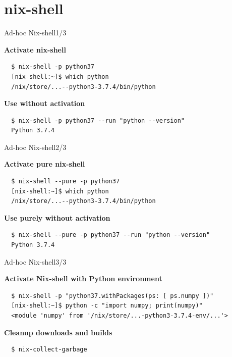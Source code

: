 \documentclass[10pt,aspectratio=169]{beamer}
\begin{document}
\section{nix-shell}


\begin{frame}[fragile]{Ad-hoc Nix-shell\hfill1/3}

  \textbf{Activate nix-shell}
  \begin{verbatim}
  $ nix-shell -p python37
  [nix-shell:~]$ which python
  /nix/store/...--python3-3.7.4/bin/python
  \end{verbatim}

  \textbf{Use without activation}
  \begin{verbatim}
  $ nix-shell -p python37 --run "python --version"
  Python 3.7.4
  \end{verbatim}

\end{frame}


\begin{frame}[fragile]{Ad-hoc Nix-shell\hfill2/3}

  \textbf{Activate pure nix-shell}
  \begin{verbatim}
  $ nix-shell --pure -p python37
  [nix-shell:~]$ which python
  /nix/store/...--python3-3.7.4/bin/python
  \end{verbatim}

  \textbf{Use purely without activation}
  \begin{verbatim}
  $ nix-shell --pure -p python37 --run "python --version"
  Python 3.7.4
  \end{verbatim}

\end{frame}


\begin{frame}[fragile]{Ad-hoc Nix-shell\hfill3/3}

  \textbf{Activate Nix-shell with Python environment}
  \begin{verbatim}
  $ nix-shell -p "python37.withPackages(ps: [ ps.numpy ])"
  [nix-shell:~]$ python -c "import numpy; print(numpy)"
  <module 'numpy' from '/nix/store/...-python3-3.7.4-env/...'>
  \end{verbatim}

  \textbf{Cleanup downloads and builds}
  \begin{verbatim}
  $ nix-collect-garbage
  \end{verbatim}

\end{frame}
\end{document}
